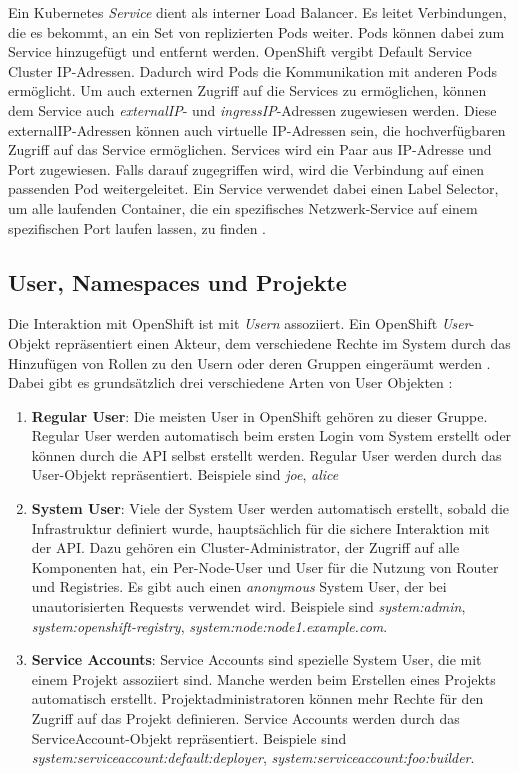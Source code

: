 Ein Kubernetes \textit{Service} dient als interner Load Balancer. Es leitet Verbindungen, die es bekommt, an ein Set von replizierten Pods weiter. Pods können dabei zum Service hinzugefügt und entfernt werden. OpenShift vergibt Default Service Cluster IP-Adressen. Dadurch wird Pods die Kommunikation mit anderen Pods ermöglicht. Um auch externen Zugriff auf die Services zu ermöglichen, können dem Service auch \textit{externalIP}- und \textit{ingressIP}-Adressen zugewiesen werden. Diese externalIP-Adressen können auch virtuelle IP-Adressen sein, die hochverfügbaren Zugriff auf das Service ermöglichen.
Services wird ein Paar aus IP-Adresse und Port zugewiesen. Falls darauf zugegriffen wird, wird die Verbindung auf einen passenden Pod weitergeleitet. Ein Service verwendet dabei einen Label Selector, um alle laufenden Container, die ein spezifisches Netzwerk-Service auf einem spezifischen Port laufen lassen, zu finden \cite{OpenShiftOnline}.

\subsection{User, Namespaces und Projekte}
Die Interaktion mit OpenShift ist mit \textit{Usern} assoziiert. Ein OpenShift \textit{User}-Objekt repräsentiert einen Akteur, dem verschiedene Rechte im System durch das Hinzufügen von Rollen zu den Usern oder deren Gruppen eingeräumt werden \cite{OpenShiftOnline}.
Dabei gibt es grundsätzlich drei verschiedene Arten von User Objekten \cite{OpenShiftOnline}:
\begin{enumerate}
	\item \textbf{Regular User}: Die meisten User in OpenShift gehören zu dieser Gruppe. Regular User werden automatisch beim ersten Login vom System erstellt oder können durch die API selbst erstellt werden. Regular User werden durch das User-Objekt repräsentiert. \linebreak
	Beispiele sind \textit{joe}, \textit{alice}
	\item \textbf{System User}: Viele der System User werden automatisch erstellt, sobald die Infrastruktur definiert wurde, hauptsächlich für die sichere Interaktion mit der API. Dazu gehören ein Cluster-Administrator, der Zugriff auf alle Komponenten hat, ein Per-Node-User und User für die Nutzung von Router und Registries. Es gibt auch einen \textit{anonymous} System User, der bei unautorisierten Requests verwendet wird. \linebreak
	Beispiele sind \textit{system:admin}, \textit{system:openshift-registry}, \textit{system:node:node1.example.com}.
	\item \textbf{Service Accounts}: Service Accounts sind spezielle System User, die mit einem Projekt assoziiert sind. Manche werden beim Erstellen eines Projekts automatisch erstellt. Projektadministratoren können mehr Rechte für den Zugriff auf das Projekt definieren. Service Accounts werden durch das ServiceAccount-Objekt repräsentiert. \linebreak
	Beispiele sind \textit{system:serviceaccount:default:deployer}, \textit{system:serviceaccount:foo:builder}.
\end{enumerate}

